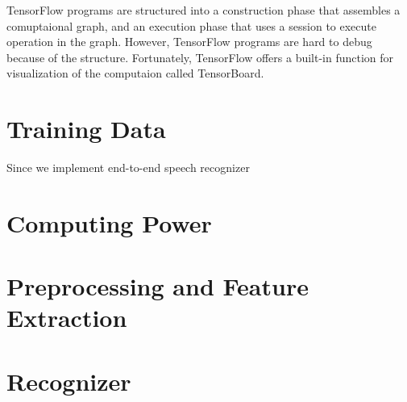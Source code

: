 TensorFlow programs are structured into a construction phase that assembles a comuptaional graph, and an execution phase that uses a session to execute operation in the graph.
However, TensorFlow programs are hard to debug because of the structure. Fortunately, TensorFlow offers a built-in function for visualization of the computaion called TensorBoard.

\section{Training Data}

Since we implement end-to-end speech recognizer

\section{Computing Power}

\section{Preprocessing and Feature Extraction}

\section{Recognizer}
